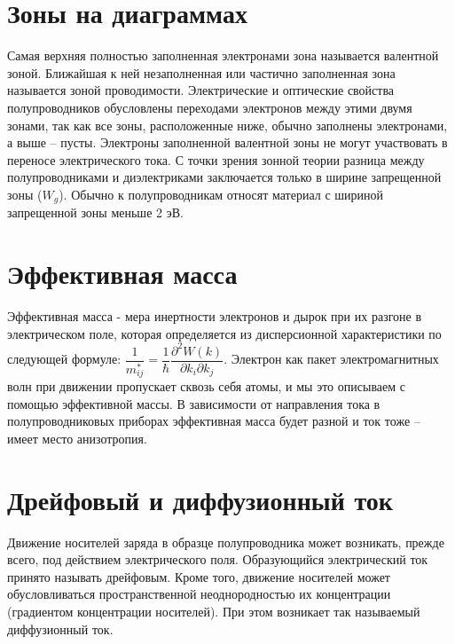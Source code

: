 \begin{multicols*}{2}
		\section{Зоны на диаграммах}
		Самая верхняя полностью заполненная электронами зона называется валентной зоной. Ближайшая к ней незаполненная или частично заполненная зона называется зоной проводимости. Электрические и оптические свойства полупроводников обусловлены переходами электронов между этими двумя зонами, так как все зоны, расположенные ниже, обычно заполнены электронами, а выше – пусты. Электроны заполненной валентной зоны не могут участвовать в переносе электрического тока. С точки зрения зонной теории разница между полупроводниками и диэлектриками заключается только в ширине запрещенной зоны ($W_g$). Обычно к полупроводникам относят материал с шириной запрещенной зоны меньше 2 эВ.

		\section{Эффективная масса}
		Эффективная масса - мера инертности электронов и дырок при их разгоне в электрическом поле, которая определяется из дисперсионной характеристики по следующей формуле: $\dfrac{1}{m^*_{ij}} = \dfrac{1}{\hbar} \dfrac{\partial^2 W(k)}{\partial k_i \partial k_j}$. Электрон как пакет электромагнитных волн при движении пропускает сквозь себя атомы, и мы это описываем с помощью эффективной массы. В зависимости от направления тока в полупроводниковых приборах эффективная масса будет разной и ток тоже – имеет место анизотропия.

		\section{Дрейфовый и диффузионный ток}
		Движение носителей заряда в образце полупроводника может возникать, прежде всего, под действием электрического поля. Образующийся электрический ток принято называть дрейфовым. Кроме того, движение носителей может обусловливаться пространственной неоднородностью их концентрации (градиентом концентрации носителей). При этом возникает так называемый диффузионный ток.


\end{multicols*}

